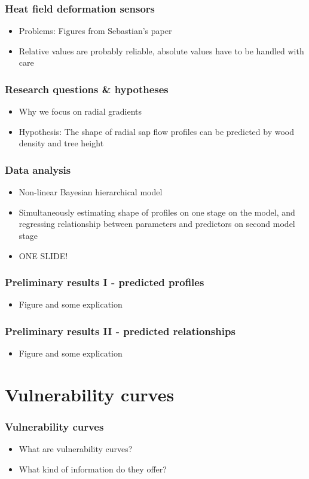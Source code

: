 \documentclass[usepdftitle=false]{beamer}
\begin{document}
\begin{frame}
	\frametitle{Heat field deformation sensors}
	\begin{itemize}
		\item Problems: Figures from Sebastian's paper
		\item Relative values are probably reliable, absolute values have to be handled with care
	\end{itemize}
\end{frame}

\begin{frame}
	\frametitle{Research questions \& hypotheses}
	\begin{itemize}
		\item Why we focus on radial gradients
		\item Hypothesis: The shape of radial sap flow profiles can be predicted by wood density and tree height 
	\end{itemize}
\end{frame}

\begin{frame}
	\frametitle{Data analysis}
	\begin{itemize}
		\item Non-linear Bayesian hierarchical model
		\item Simultaneously estimating shape of profiles on one stage on the model, and regressing relationship between parameters and predictors on second model stage
		\item ONE SLIDE!
	\end{itemize}
\end{frame}

\begin{frame}
	\frametitle{Preliminary results I - predicted profiles}
	\begin{itemize}
		\item Figure and some explication 
	\end{itemize}
\end{frame}

\begin{frame}
	\frametitle{Preliminary results II - predicted relationships}
	\begin{itemize}
		\item Figure and some explication 
	\end{itemize}
\end{frame}

\section{Vulnerability curves}
\begin{frame}
	\frametitle{Vulnerability curves}
	\begin{itemize}
		\item What are vulnerability curves?
		\item What kind of information do they offer?
	\end{itemize}  
\end{frame}
\end{document}

